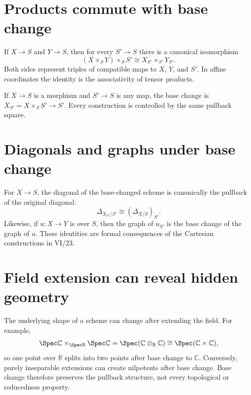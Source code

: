 

\section{Products commute with base change}
If $X\to S$ and $Y\to S$, then for every $S'\to S$ there is a canonical isomorphism
\[
(X\times_S Y)\times_S S'
\cong
X_{S'}\times_{S'}Y_{S'}.
\]
Both sides represent triples of compatible maps to $X$, $Y$, and $S'$.  In affine coordinates the
identity is the associativity of tensor products.



\begin{example}\label{ex:vi24-expand-03}
If $X\to S$ is a morphism and $S'\to S$ is any map, the base change is $X_{S'}=X\times_S S'\to S'$.  Every construction is controlled by the same pullback square.
\end{example}
\section{Diagonals and graphs under base change}
For $X\to S$, the diagonal of the base-changed scheme is canonically the pullback of the original
diagonal:
\[
\Delta_{X_{S'}/S'}\cong(\Delta_{X/S})_{S'}.
\]
Likewise, if $u:X\to Y$ is over $S$, then the graph of $u_{S'}$ is the base change of the graph of
$u$.  These identities are formal consequences of the Cartesian constructions in VI/23.



\section{Field extension can reveal hidden geometry}
The underlying shape of a scheme can change after extending the field.  For example,
\[
\Spec\mathbb C\times_{\Spec\mathbb R}\Spec\mathbb C
=
\Spec(\mathbb C\otimes_{\mathbb R}\mathbb C)
\cong
\Spec(\mathbb C\times\mathbb C),
\]
so one point over $\mathbb R$ splits into two points after base change to $\mathbb C$.  Conversely,
purely inseparable extensions can create nilpotents after base change.  Base change therefore
preserves the pullback structure, not every topological or reducedness property.




